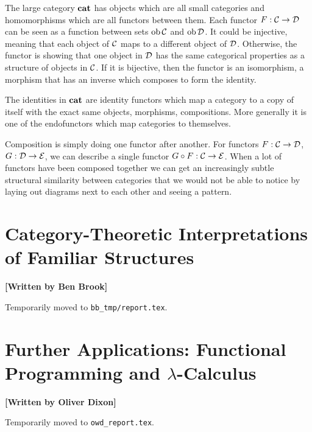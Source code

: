 \documentclass[10pt,a4paper,reqno]{amsart}
\numberwithin{figure}{section}
\begin{document}
The large category $\operatorname{\mathbf{cat}}$ has objects which are all small categories
and homomorphisms which are all functors between them.
Each functor $F: \mathcal{C}\to\mathcal{D}$ can be seen as a function between
sets $\operatorname{ob}{\mathcal{C}}$ and $\operatorname{ob}{\mathcal{D}}$.
It could be injective, meaning that each object of $\mathcal{C}$ maps to a 
different object of $\mathcal{D}$. Otherwise, the functor is showing that 
one object in $\mathcal{D}$ has the same categorical properties as 
a structure of objects in $\mathcal{C}$. If it is bijective, then the 
functor is an isomorphism, a morphism that has an inverse which composes 
to form the identity.

The identities in $\operatorname{\mathbf{cat}}$ are identity functors which map a category to a
copy of itself with the exact same objects, morphisms, compositions. More generally
it is one of the endofunctors which map categories to themselves.

Composition is simply doing one functor after another.
For functors $F:\mathcal{C}\to\mathcal{D}$, $G:\mathcal{D}\to\mathcal{E}$, 
we can describe a single functor $G\circ F:\mathcal{C}\to\mathcal{E}$. 
When a lot of functors have been composed together we can get an increasingly
subtle structural similarity between categories that we would not be able to
notice by laying out diagrams next to each other and seeing a pattern.
\section{Category-Theoretic %
        Interpretations of Familiar Structures}
\begin{flushright}
        \textbf{[Written by Ben Brook]}
\end{flushright}

\noindent Temporarily moved to \texttt{bb\_tmp/report.tex}.

\section{Further Applications: %
        Functional Programming and \texorpdfstring{$\lambda$}{Lambda}-Calculus}
\begin{flushright}
        \textbf{[Written by Oliver Dixon]}
\end{flushright}

\noindent Temporarily moved to \texttt{owd\_report.tex}.
\printbibliography[title=Cited Works]
\end{document}
